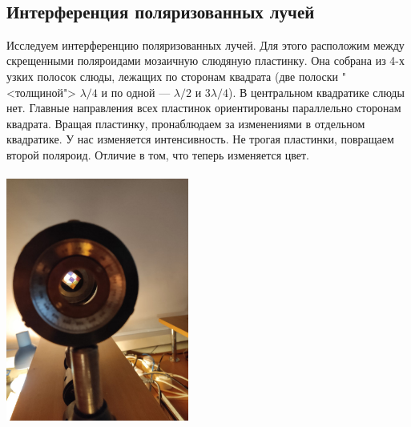 \documentclass[a4paper]{article}
\begin{document}
\begin{minipage}{0.47\textwidth}
\begin{center}
\end{center}
\end{minipage}
\\
\begin{minipage}{0.47\textwidth}
\begin{center}
\end{center}
\end{minipage}
\subsection{Интерференция поляризованных лучей}

Исследуем интерференцию поляризованных лучей. Для этого расположим между скрещенными поляроидами мозаичную слюдяную пластинку. Она собрана из 4-х узких полосок слюды, лежащих по сторонам квадрата (две полоски "<толщиной"> $ \lambda/4 $ и по одной --- $ \lambda/2 $ и $ 3\lambda/4 $). В центральном квадратике слюды нет. Главные направления всех пластинок ориентированы параллельно сторонам квадрата. Вращая пластинку, пронаблюдаем за изменениями в отдельном квадратике. У нас изменяется интенсивность.  Не трогая пластинки, повращаем второй поляроид. Отличие в том, что теперь изменяется цвет.
\\
\\
\includegraphics[width=6cm]{g9}\\
\end{document}

